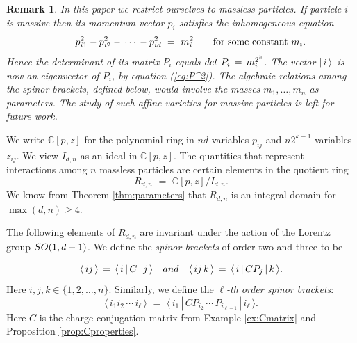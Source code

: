 \documentclass[english]{ourlematema}
\numberwithin{theorem}{section}
\newtheorem{remark}[theorem]{Remark}
\theoremstyle{definition}
\newcommand{\CC}{\mathbb{C}}
\begin{document}
\begin{remark}
In this paper we restrict ourselves to massless particles.
If particle $i$ is massive then its momentum vector
$p_i $ satisfies the inhomogeneous equation
$$  \qquad p_{i1}^2 - p_{i2}^2 -\, \cdots\, - p_{id}^2 \,\,=\,\,  m_i^2  \qquad
\hbox{for some constant $m_i$.} $$
Hence the determinant of its matrix $P_i$
equals ${\rm det}\,\,P_i\, =\, m_i^{2^k}$.
The vector $|\, i\, \rangle \,$ is now an eigenvector of $P_i$, by equation (\ref{eq:P^2}).
The algebraic relations among the spinor brackets, defined  below,
 would involve the masses $m_1,\ldots,m_n$ as parameters.
The study of such affine varieties for
 massive particles is left for future work.
\end{remark}

We write $\CC[p,z]$  for the polynomial ring
in $nd$ variables $p_{ij}$ and $n2^{k - 1}$ variables $z_{ij}$.
We view $I_{d,n}$ as an ideal in $\CC[p,z]$.
The quantities that represent interactions among
$n$ massless particles are certain elements in the
quotient ring
$$ R_{d,n} \,\, = \,\, \CC[p,z]/I_{d,n} .$$
We know from Theorem \ref{thm:parameters}
that $R_{d,n}$ is an integral domain for $\max(d,n) \geq 4$.

The following elements of $R_{d,n}$  are invariant under the  action
of the Lorentz group ${\rm SO}(1,d-1)$.
We define the {\em spinor brackets} of order two and three to be

\begin{equation} \label{eq:23brackets}
    \langle \, i j\, \rangle \,=\, \langle \, i \, | \, C \, | \, j\, \rangle
    \quad {\rm and} \quad \langle \, ij \,k\, \rangle \,=\, \langle \, i \, | \, C P_j \, | \, k\, \rangle.
\end{equation}
Here $i,j,k \in \{1,2,\ldots,n\}$.
Similarly, we define the {\em $\ell$-th order spinor brackets}:
\begin{equation}\label{eq:lthorderbrackets}
    \langle \, i_1 i_2 \,\cdots\, i_\ell\, \rangle 
    \,\,=\,\,  \langle \, i_1 \, | \, C P_{i_2} \,\cdots \,P_{i_{\ell - 1}} \, | \, i_\ell\, \rangle.
\end{equation}
Here $C$ is the charge conjugation matrix from
Example \ref{ex:Cmatrix} and Proposition \ref{prop:Cproperties}.
\end{document}
